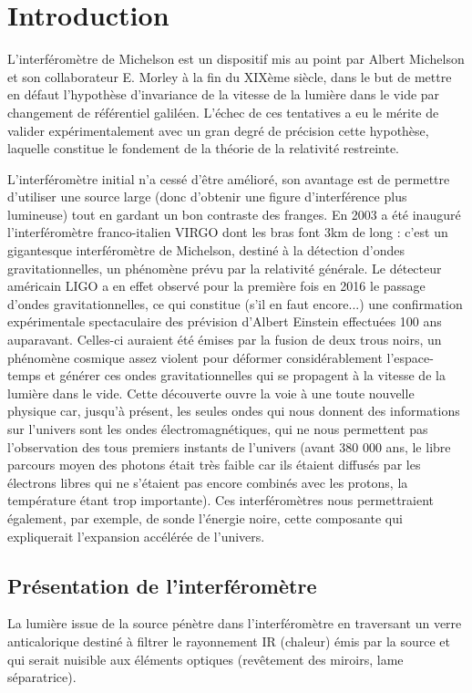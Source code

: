 \documentclass[french]{book}
\theoremstyle{plain}
\theoremstyle{definition}
\theoremstyle{remark}
\begin{document}
\section{Introduction}
L'interféromètre de Michelson est un dispositif mis au point par Albert Michelson et son collaborateur E. Morley à la fin du XIXème siècle, dans le but de mettre en défaut l'hypothèse d'invariance de la vitesse de la lumière dans le vide par changement de référentiel galiléen. L'échec de ces tentatives a eu le mérite de valider expérimentalement avec un gran degré de précision cette hypothèse, laquelle constitue le fondement de la théorie de la relativité restreinte. \\ \par L'interféromètre initial n'a cessé d'être amélioré, son avantage est de permettre d'utiliser une source large (donc d'obtenir une figure d'interférence plus lumineuse) tout en gardant un bon contraste des franges. En 2003 a été inauguré l'interféromètre franco-italien VIRGO dont les bras font 3km de long : c'est un gigantesque interféromètre de Michelson, destiné à la détection d'ondes gravitationnelles, un phénomène prévu par la relativité générale. Le détecteur américain LIGO a en effet observé pour la première fois en 2016 le passage d'ondes gravitationnelles, ce qui constitue (s'il en faut encore...) une confirmation expérimentale spectaculaire des prévision d'Albert Einstein effectuées 100 ans auparavant. Celles-ci auraient été émises par la fusion de deux trous noirs, un phénomène cosmique assez violent pour déformer considérablement l'espace-temps et générer ces ondes gravitationnelles qui se propagent à la vitesse de la lumière dans le vide. Cette découverte ouvre la voie à une toute nouvelle physique car, jusqu'à présent, les seules ondes qui nous donnent des informations sur l'univers sont les ondes électromagnétiques, qui ne nous permettent pas l'observation des tous premiers instants de l'univers (avant 380 000 ans, le libre parcours moyen des photons était très faible car ils étaient diffusés par les électrons libres qui ne s'étaient pas encore combinés avec les protons, la température étant trop importante). Ces interféromètres nous permettraient également, par exemple, de sonde l'énergie noire, cette composante qui expliquerait l'expansion accélérée de l'univers.
\subsection{Présentation de l'interféromètre}
La lumière issue de la source pénètre dans l'interféromètre en traversant un verre anticalorique destiné à filtrer le rayonnement IR (chaleur) émis par la source et qui serait nuisible aux éléments optiques (revêtement des miroirs, lame séparatrice).
\end{document}
